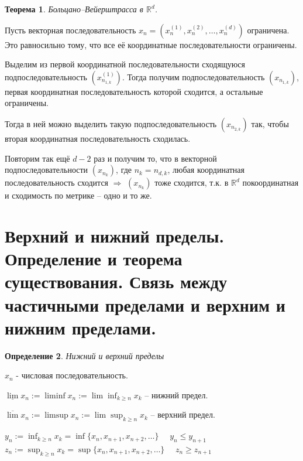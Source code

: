 \documentclass[12pt,letterpaper]{report}
\makeatletter
\newtheorem{theorem}{Теорема}
\newtheorem{conj}[theorem]{Определение}
\renewenvironment{proof}[1][\proofname]{%
   \par\pushQED{\qed}\normalfont%
   \topsep6\p@\@plus6\p@\relax
   \trivlist\item[\hskip\labelsep\bfseries#1\@addpunct{.}]%
   \ignorespaces
}{%
   \popQED\endtrivlist\@endpefalse
}
\makeatother
\begin{document}
\begin{theorem}
Больцано–Вейерштрасса в $\mathbb{R}^d$.
\end{theorem}
\begin{proof}
Пусть векторная последовательность
$x_n = (x_n^{(1)}, x_n^{(2)}, \dots, x_n^{(d)})$ ограничена.
Это равносильно тому, что все её координатные последовательности
ограничены.

Выделим из первой координатной последовательности сходящуюся
подпоследовательность $(x_{n_{1, k}}^{(1)})$. Тогда получим
подпоследовательность $(x_{n_{1, k}})$, первая координатная
последовательность которой сходится, а остальные ограничены.

Тогда в ней можно выделить такую подпоследовательность
$(x_{n_{2, k}})$ так, чтобы вторая координатная последовательность
сходилась.

Повторим так ещё $d - 2$ раз и получим то, что в векторной 
подпоследовательности $(x_{n_{k}})$, где $n_k = n_{d, k}$, 
любая координатная последовательность сходится $\Rightarrow$
$(x_{n_{k}})$ тоже сходится, т.к. в $\mathbb{R}^d$ покоординатная и
сходимость по метрике -- одно и то же.

\end{proof}


\section{Верхний и нижний пределы. Определение и
теорема существования. Связь между частичными пределами и  
верхним и нижним пределами.}

\begin{conj}
Нижний и верхний пределы
\end{conj}
$x_n$ - числовая последовательность.

$\underline{\lim} x_n := \liminf x_n := \lim \inf_{k \geq n} x_k$ -- 
нижний предел.

$\overline{\lim} x_n := \limsup x_n := \lim \sup_{k \geq n} x_k$ -- 
верхний предел.

$y_n := \inf_{k \geq n} x_k = \inf\{x_n, x_{n+1}, x_{n+2}, \dots\}$
$\quad y_n \leq y_{n+1}$\\
$z_n := \sup_{k \geq n} x_k = \sup\{x_n, x_{n+1}, x_{n+2}, \dots\}$
$\quad z_n \geq z_{n+1}$
\end{document}
